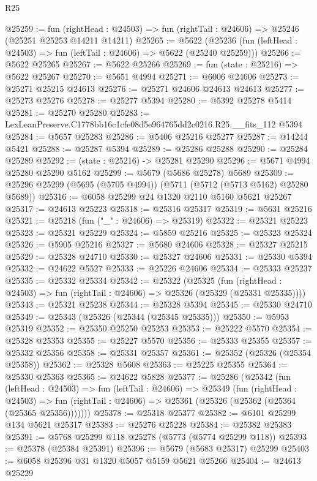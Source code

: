 \begin{lexlean}{R25}
\begin{coremodule}
@25259 := fun (rightHead : @24503) =>
  fun (rightTail : @24606) => @25246 (@25251 @25253 @14211 @14211)
@25265 := @5622
    (@25236 (fun (leftHead : @24503) => fun (leftTail : @24606) => @5622 (@25240 @25259)))
@25266 := @5622 @25265
@25267 := @5622 @25266
@25269 := fun (state : @25216) => @5622 @25267
@25270 := @5651 @4994
@25271 := @6006 @24606
@25273 := @25271 @25215 @24613
@25276 := @25271 @24606 @24613 @24613
@25277 := @25273 @25276
@25278 := @25277 @5394
@25280 := @5392 @25278 @5414
@25281 := @25270 @25280
@25283 := LexLeanPreserve.C1778bb16c1cfe08d5e964765dd2c0216.R25.__fits_112 @5394
@25284 := @5657 @25283
@25286 := @5406 @25216 @25277
@25287 := @14244 @5421
@25288 := @25287 @5394
@25289 := @25286 @25288
@25290 := @25284 @25289
@25292 := (state : @25216) -> @25281 @25290
@25296 := @5671 @4994 @25280 @25290 @5162
@25299 := @5679 (@5686 @25278) @5689
@25309 := @25296 @25299 (@5695 (@5705 @4994)) (@5711 (@5712 (@5713 @5162) @25280 @5689))
@25316 := @6058 @25299 @24 @1320 @2110 @5160 @5621 @25267
@25317 := @24613 @25223
@25318 := @25316 @25317
@25319 := @5631 @25216
@25321 := @25218 (fun ("_" : @24606) => @25319)
@25322 := @25321 @25223
@25323 := @25321 @25229
@25324 := @5859 @25216
@25325 := @25323 @25324
@25326 := @5905 @25216
@25327 := @5680 @24606
@25328 := @25327 @25215
@25329 := @25328 @24710
@25330 := @25327 @24606
@25331 := @25330 @5394
@25332 := @24622 @5527
@25333 := @25226 @24606
@25334 := @25333 @25237
@25335 := @25332 @25334
@25342 := @25322
    (@25325
      (fun (rightHead : @24503) => fun (rightTail : @24606) => @25326 (@25329 (@25331 @25335))))
@25343 := @25321 @25238
@25344 := @25328 @5394
@25345 := @25330 @24710
@25349 := @25343 (@25326 (@25344 (@25345 @25335)))
@25350 := @5953 @25319
@25352 := @25350 @25250 @25253
@25353 := @25222 @5570
@25354 := @25328 @25353
@25355 := @25227 @5570
@25356 := @25333 @25355
@25357 := @25332 @25356
@25358 := @25331 @25357
@25361 := @25352 (@25326 (@25354 @25358))
@25362 := @25328 @5608
@25363 := @25225 @25355
@25364 := @25330 @25363
@25365 := @24622 @5828
@25377 := @25286
    (@25342
      (fun (leftHead : @24503) =>
      fun (leftTail : @24606) =>
      @25349
        (fun (rightHead : @24503) =>
        fun (rightTail : @24606) => @25361 (@25326 (@25362 (@25364 (@25365 @25356)))))))
@25378 := @25318 @25377
@25382 := @6101 @25299 @134 @5621 @25317
@25383 := @25276 @25228
@25384 := @25382 @25383
@25391 := @5768 @25299 @118 @25278 (@5773 (@5774 @25299 @118))
@25393 := @25378 (@25384 @25391)
@25396 := @5679 (@5683 @25317) @25299
@25403 := @6058 @25396 @31 @1320 @5057 @5159 @5621 @25266
@25404 := @24613 @25229

\end{coremodule}
\end{lexlean}
